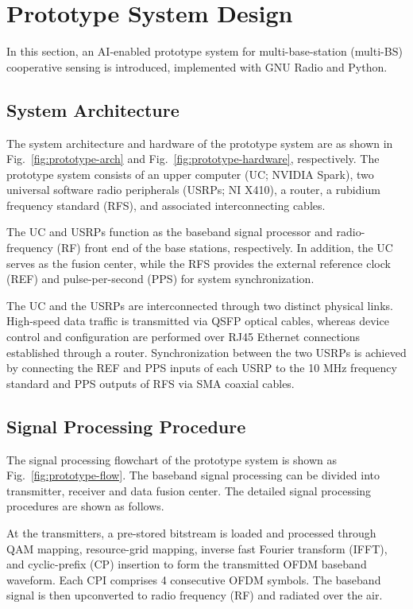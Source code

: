 \documentclass[sigconf]{acmart}
\begin{document}
\section{Prototype System Design}
\label{sec:prototype-system-design}
In this section, an AI-enabled prototype system for multi-base-station (multi-BS) cooperative sensing is introduced, implemented with GNU Radio and Python.

\subsection{System Architecture}
The system architecture and hardware of the prototype system are as shown in Fig.~\ref{fig:prototype-arch} and Fig.~\ref{fig:prototype-hardware}, respectively. The prototype system consists of an upper computer (UC; NVIDIA Spark), two universal software radio peripherals (USRPs; NI X410), a router, a rubidium frequency standard (RFS), and associated interconnecting cables. 

The UC and USRPs function as the baseband signal processor and radio-frequency (RF) front end of the base stations, respectively. In addition, the UC serves as the fusion center, while the RFS provides the external reference clock (REF) and pulse-per-second (PPS) for system synchronization.

The UC and the USRPs are interconnected through two distinct physical links. High-speed data traffic is transmitted via QSFP optical cables, whereas device control and configuration are performed over RJ45 Ethernet connections established through a router. Synchronization between the two USRPs is achieved by connecting the REF and PPS inputs of each USRP to the 10 MHz frequency standard and PPS outputs of RFS via SMA coaxial cables.

\subsection{Signal Processing Procedure}
The signal processing flowchart of the prototype system is shown as Fig.~\ref{fig:prototype-flow}. The baseband signal processing can be divided into transmitter, receiver and data fusion center. The detailed signal processing procedures are shown as follows.

At the transmitters, a pre-stored bitstream is loaded and processed through QAM mapping, resource-grid mapping, inverse fast Fourier transform (IFFT), and cyclic-prefix (CP) insertion to form the transmitted OFDM baseband waveform. Each CPI comprises 4 consecutive OFDM symbols. The baseband signal is then upconverted to radio frequency (RF) and radiated over the air.
\end{document}
